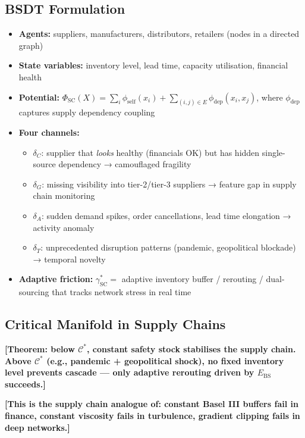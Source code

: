 \documentclass[11pt,a4paper]{article}
\newcommand{\Ebs}{E_{\mathrm{BS}}}
\newcommand{\Cman}{\mathcal{C}^*}
\begin{document}
\subsection{BSDT Formulation}
\begin{itemize}[nosep]
  \item \textbf{Agents:} suppliers, manufacturers, distributors, retailers
        (nodes in a directed graph)
  \item \textbf{State variables:} inventory level, lead time, capacity
        utilisation, financial health
  \item \textbf{Potential:} $\Phi_{\mathrm{SC}}(X) = \sum_i \phi_{\mathrm{self}}(x_i)
        + \sum_{(i,j) \in E} \phi_{\mathrm{dep}}(x_i, x_j)$, where
        $\phi_{\mathrm{dep}}$ captures supply dependency coupling
  \item \textbf{Four channels:}
  \begin{itemize}[nosep]
    \item $\delta_C$: supplier that \emph{looks} healthy (financials OK)
          but has hidden single-source dependency → camouflaged fragility
    \item $\delta_G$: missing visibility into tier-2/tier-3 suppliers →
          feature gap in supply chain monitoring
    \item $\delta_A$: sudden demand spikes, order cancellations, lead time
          elongation → activity anomaly
    \item $\delta_T$: unprecedented disruption patterns (pandemic,
          geopolitical blockade) → temporal novelty
  \end{itemize}
  \item \textbf{Adaptive friction:} $\gamma^*_{\mathrm{SC}} = $ adaptive
        inventory buffer / rerouting / dual-sourcing that tracks
        network stress in real time
\end{itemize}

\subsection{Critical Manifold in Supply Chains}

\textbf{[Theorem: below $\Cman$, constant safety stock stabilises
the supply chain. Above $\Cman$ (e.g., pandemic + geopolitical shock),
no fixed inventory level prevents cascade — only adaptive rerouting
driven by $\Ebs$ succeeds.]}

\textbf{[This is the supply chain analogue of: constant Basel III
buffers fail in finance, constant viscosity fails in turbulence,
gradient clipping fails in deep networks.]}
\end{document}
